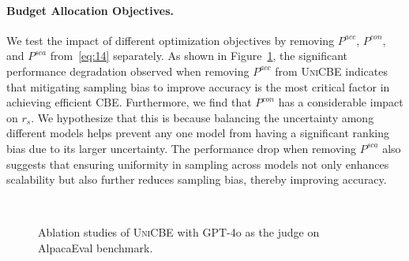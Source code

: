 \paragraph{Budget Allocation Objectives.}
We test the impact of different optimization objectives by removing \(P^{acc}\), \(P^{con}\), and \(P^{sca}\) from~\eqref{eq:14} separately. As shown in Figure~\ref{fig:main-4o-ab}, the significant performance degradation observed when removing \( P^{acc} \) from \textsc{UniCBE} indicates that mitigating sampling bias to improve accuracy is the most critical factor in achieving efficient CBE. Furthermore, we find that \( P^{con} \) has a considerable impact on \( r_s \). We hypothesize that this is because balancing the uncertainty among different models helps prevent any one model from having a significant ranking bias due to its larger uncertainty. The performance drop when removing \( P^{sca} \) also suggests that ensuring uniformity in sampling across models not only enhances scalability but also further reduces sampling bias, thereby improving accuracy.
\begin{figure}[t]
    \centering
    \hfill
    \hfill
     \\
    \hfill
    \hfill
    \vspace{-0.2cm}
    \caption{Ablation studies of \textsc{UniCBE} with GPT-4o as the judge on AlpacaEval benchmark. }
    \vspace{-0.4cm}
    \label{fig:main-4o-ab}
\end{figure}

